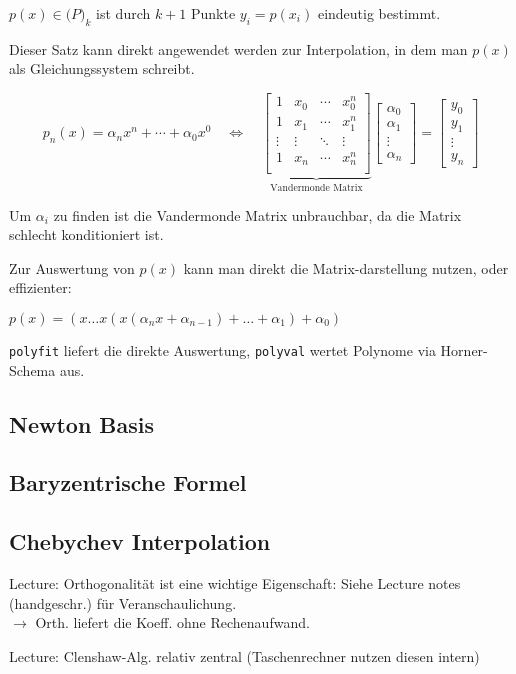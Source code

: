  $p(x) \in \mathcal(P)_k$ ist durch $k+1$ Punkte $y_i = p(x_i)$ eindeutig bestimmt.

Dieser Satz kann direkt angewendet werden zur Interpolation, in dem man $p(x)$ als Gleichungssystem schreibt.

$$
p_n(x) = \alpha_n x^n + \cdots + \alpha_0 x^0 \quad \iff \quad 
\underbrace{
    \begin{bmatrix}
    1 & x_0 & \cdots & x_0^n \\
    1 & x_1 & \cdots & x_1^n \\
    \vdots  & \vdots & \ddots & \vdots \\
    1 & x_n & \cdots & x_n^n \\
    \end{bmatrix}
}_\text{Vandermonde Matrix}
\begin{bmatrix}
    \alpha_0 \\
    \alpha_1 \\
    \vdots   \\
    \alpha_n
\end{bmatrix}
=
\begin{bmatrix}
    y_0 \\
    y_1 \\
    \vdots \\
    y_n
\end{bmatrix}
$$

Um $\alpha_i$ zu finden ist die Vandermonde Matrix unbrauchbar, da die Matrix schlecht konditioniert ist.

Zur Auswertung von $p(x)$ kann man direkt die Matrix-darstellung nutzen, oder effizienter:

 $p(x) = (x \ldots x ( x (\alpha_n x + \alpha_{n-1}) + \ldots + \alpha_1) + \alpha_0)$

 \verb|polyfit| liefert die direkte Auswertung, \verb|polyval| wertet Polynome via Horner-Schema aus.

\subsection{Newton Basis}

\subsection{Baryzentrische Formel}

\subsection{Chebychev Interpolation}

Lecture: Orthogonalität ist eine wichtige Eigenschaft: Siehe Lecture notes (handgeschr.) für Veranschaulichung. \\
$\rightarrow$ Orth. liefert die Koeff. ohne Rechenaufwand.

Lecture: Clenshaw-Alg. relativ zentral (Taschenrechner nutzen diesen intern)
